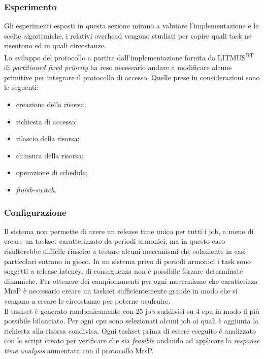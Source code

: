 \subsubsection{Esperimento}
\label{sec:overhead_exp}

\noindent Gli esperimenti esposti in questa sezione mirano a valutare l'implementazione e le scelte algoritmiche, i relativi overhead vengono studiati per capire quali task ne risentono ed in quali circostanze.\\

\noindent Lo sviluppo del protocollo a partire dall'implementazione fornita da LITMUS\textsuperscript{RT} di \textit{partitioned fixed priority} ha reso necessario andare a modificare alcune primitive per integrare il protocollo di accesso. Quelle prese in considerazioni sono le seguenti:

\begin{itemize}
	\item creazione della risorsa;
	\item richiesta di accesso;
	\item rilascio della risorsa;
	\item chiusura della risorsa;
	\item operazione di schedule;
	\item \textit{finish-switch}.
\end{itemize}

\subsubsection{Configurazione}
\label{sec:overhead_conf}

\noindent Il sistema non permette di avere un release time unico per tutti i job, a meno di creare un taskset caratterizzato da periodi armonici, ma in questo caso risulterebbe difficile riuscire a testare alcuni meccanismi che solamente in casi particolari entrano in gioco. In un sistema privo di periodi armonici i task sono soggetti a release latency, di conseguenza non è possibile forzare determinate dinamiche. Per ottenere dei campionamenti per ogni meccanismo che caratterizza MrsP è necessario creare un taskset sufficientemente grande in modo che si vengano a creare le circostanze per poterne usufruire.\\
\noindent Il taskset è generato randomicamente con 25 job suddivisi su 4 cpu in modo il più possibile bilanciato. Per ogni cpu sono selezionati alcuni job ai quali è aggiunta la richiesta alla risorsa condivisa. Ogni taskset prima di essere eseguito è analizzato con lo script creato per verificare che sia \textit{feasible} andando ad applicare la \textit{response time analysis} aumentata con il protocollo MrsP.\\

